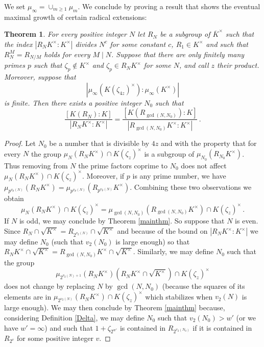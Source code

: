 \documentclass[11pt, a4paper]{amsart}
\newtheorem {thm}{Theorem}
\theoremstyle{definition}
\renewcommand{\geq}{\geqslant}
\begin{document}
We set $\mu_\infty=\cup_{m\geq 1}\mu_m$. We conclude by proving a result that shows the eventual maximal growth of certain radical extensions:

\begin{thm}\label{eventual}
For every positive integer $N$ let $R_N$ be a subgroup of $\overline{K}^\times$ such that the index $|R_NK^\times:K^\times|$ divides $N^c$ for some constant $c$, $R_1\in K^\times$ and such that $R_{N}^M=R_{N/M}$ holds for every $M\mid N$. Suppose that there are only finitely many primes $p$ such that $\zeta_p\notin K^\times$ and $\zeta_p\in R_N K^\times$ for some $N$, and call $z$ their product. Moreover, suppose that 
$$|\mu_{\infty}(K(\zeta_{4z})^\times):\mu_{\infty}(K^\times)|$$
is finite.
Then there exists a positive integer $N_0$ such that 
$$\frac{[K(R_N):K]}{|R_NK^\times:K^\times|}=\frac{[K(R_{\gcd(N,N_0)}):K]}{|R_{\gcd(N,N_0)}K^\times:K^\times|}\,.$$
\end{thm}
\begin{proof}
Let $N_0$ be a number that is divisible by $4z$ and with the property that for every $N$ the group $\mu_{N}(R_N K^\times)\cap K(\zeta_{z})^\times$
is a subgroup of $\mu_{N_0}(R_{N_0} K^\times)$. 
Thus removing from $N$ the prime factors coprime to $N_0$ does not affect $\mu_{N}(R_N K^\times)\cap K(\zeta_{z})^\times$. Moreover, if $p$ is any prime number, we have  
$\mu_{p^{v_p(N)}}(R_N K^\times)=\mu_{p^{v_p(N)}}(R_{p^{v_p(N)}} K^\times)$. Combining these two observations we obtain  
$$\mu_{N}(R_N K^\times)\cap K(\zeta_{z})^\times=\mu_{\gcd(N,N_0)}(R_{\gcd(N,N_0)} K^\times)\cap K(\zeta_{z})^\times\,.$$
If $N$ is odd, we may conclude by Theorem \ref{mainthm}. So suppose that $N$ is even. Since  $R_N\cap\sqrt{K^\times}=R_{2^{v_2(N)}}\cap\sqrt{K^\times}$ and because of the bound on $|R_NK^\times:K^\times|$ we may define $N_0$ (such that $v_2(N_0)$ is large enough) so that 
$R_NK^\times\cap\sqrt{K^\times}=R_{\gcd(N,N_0)}K^\times\cap\sqrt{K^\times}$. 
Similarly, we may define $N_0$ such that the group
$$\mu_{2^{v_2(N)+1}}(R_N K^\times)(R_N K^\times\cap\sqrt{K^\times})\cap K(\zeta_z)^\times$$
does not change by replacing $N$ by $\gcd(N,N_0)$ (because the squares of its elements are in $\mu_{2^{v_2(N)}}(R_N K^\times)\cap K(\zeta_z)^\times$ which stabilizes when $v_2(N)$ is large enough). We may then conclude by Theorem \ref{mainthm} because, considering Definition \ref{Delta}, we may define $N_0$ such that $v_2(N_0)>w'$ (or we have $w'=\infty$) and such that $1+\zeta_{2^{w'}}$ is contained in $R_{2^{v_2(N_0)}}$ if it is contained in $R_{2^{v}}$ for some positive integer $v$.
\end{proof}
\end{document}
